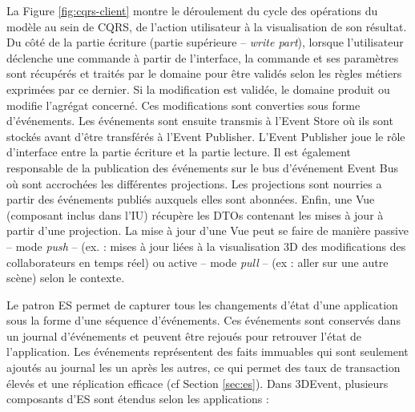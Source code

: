 La Figure \ref{fig:cqrs-client} montre le déroulement du cycle des opérations du 
modèle au sein de \gls{CQRS}, de l'action utilisateur à la visualisation de son 
résultat. 
Du côté de la partie écriture (partie supérieure -- \textit{write part}), lorsque 
l'utilisateur déclenche une commande à partir de l'interface, la commande et ses 
paramètres sont récupérés et traités par le domaine pour être validés selon les 
règles métiers exprimées par ce dernier. Si la modification est validée, le domaine 
produit ou modifie l'agrégat concerné. Ces modifications sont converties sous 
forme d'événements. Les événements sont ensuite transmis à l'Event Store où ils 
sont stockés 
avant d'être transférés à l'Event Publisher. L'Event Publisher joue le rôle 
d'interface entre la partie écriture et la partie lecture. 
Il est également responsable de la 
publication des événements sur le bus d'événement Event Bus où sont 
accrochées les différentes projections. Les projections sont nourries a partir des 
événements publiés auxquels elles sont abonnées. Enfin, une Vue (composant
inclus dans l'\gls{IU}) récupère les \glspl{DTO}
contenant les mises à jour à partir d'une projection. La mise à jour d'une Vue peut 
se faire de manière passive -- mode \textit{push} -- (ex. : mises à jour liées à la 
visualisation 3D des modifications des collaborateurs en temps réel) ou active -- 
mode \textit{pull} -- (ex : aller sur une autre scène) selon le contexte.


Le patron \gls{ES} permet de capturer tous les changements d'état 
d'une application sous la forme d'une séquence d'événements. 
Ces événements sont conservés dans un journal d'événements et peuvent être 
rejoués pour retrouver l'état de l'application. 
Les événements représentent des faits immuables qui sont 
seulement ajoutés au journal les un après les autres, ce qui permet des taux de 
transaction élevés et une réplication efficace (cf Section 
\ref{sec:es}). Dans 3DEvent, plusieurs composants d'\gls{ES} sont étendus selon 
les applications :

